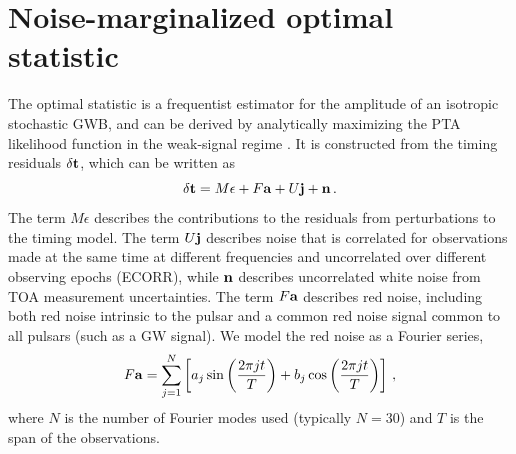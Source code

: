 \documentclass[twocolumn,aps,prd,superscriptaddress]{revtex4-1}
\newcommand{\res}{\ensuremath{\delta {\bf t}}}
\begin{document}
\section{Noise-marginalized optimal statistic}
\label{sec:marg_os}

The optimal statistic is a frequentist estimator 
for the amplitude of an isotropic stochastic GWB, 
and can be derived by analytically maximizing 
the PTA likelihood function in the weak-signal regime \citep{abc+2009,ccs+2015}. 
It is constructed from the timing residuals $\res$, 
which can be written as 
\begin{equation}
	\res = M {\bf{\epsilon}} + F {\bf{a}} + U {\bf{j}} + {\bf{n}} \,.
\end{equation}
The term $M\epsilon$ describes the contributions to the residuals 
from perturbations to the timing model. 
The term $U{\bf{j}}$ describes noise that is correlated for observations made at the same time 
at different frequencies and uncorrelated over different observing epochs (ECORR), 
while ${\bf{n}}$ describes uncorrelated white noise from TOA measurement uncertainties.
The term $F{\bf{a}}$ describes red noise, 
including both red noise intrinsic to the pulsar 
and a common red noise signal common to all pulsars (such as a GW signal). 
We model the red noise as a Fourier series,
\begin{equation}
	F {\bf{a}} = \sum_{j=1}^N \left[ a_j \sin\left( \frac{2\pi j t}{T} \right) + b_j \cos \left( \frac{2\pi j t}{T} \right) \right] \,,
\end{equation}
where $N$ is the number of Fourier modes used (typically $N=30$) 
and $T$ is the span of the observations.
\end{document}
